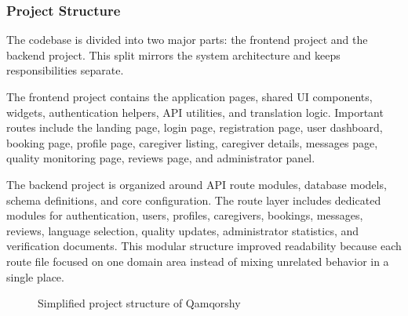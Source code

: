 \documentclass[12pt,a4paper]{article}
\begin{document}
\subsubsection{Project Structure}

The codebase is divided into two major parts: the frontend project and the backend project. This split mirrors the system architecture and keeps responsibilities separate.

The frontend project contains the application pages, shared UI components, widgets, authentication helpers, API utilities, and translation logic. Important routes include the landing page, login page, registration page, user dashboard, booking page, profile page, caregiver listing, caregiver details, messages page, quality monitoring page, reviews page, and administrator panel.

The backend project is organized around API route modules, database models, schema definitions, and core configuration. The route layer includes dedicated modules for authentication, users, profiles, caregivers, bookings, messages, reviews, language selection, quality updates, administrator statistics, and verification documents. This modular structure improved readability because each route file focused on one domain area instead of mixing unrelated behavior in a single place.

\begin{figure}[H]
\centering
{}
\caption{Simplified project structure of Qamqorshy}
\label{fig:qamqorshy-structure}
\end{figure}
\end{document}
